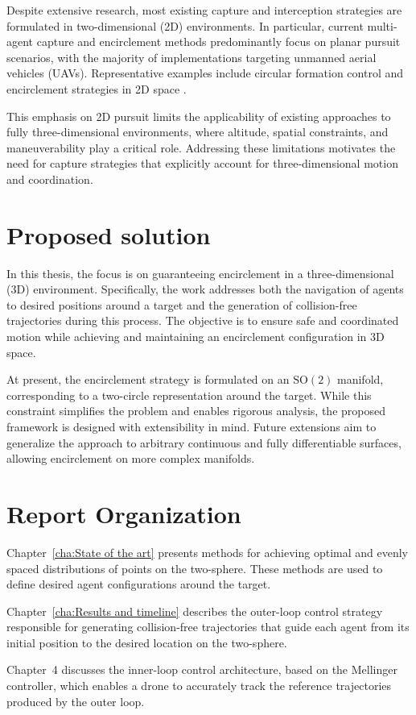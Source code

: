 Despite extensive research, most existing capture and interception strategies are formulated in two-dimensional (2D) environments. In particular, current multi-agent capture and encirclement methods predominantly focus on planar pursuit scenarios, with the majority of implementations targeting unmanned aerial vehicles (UAVs). Representative examples include circular formation control and encirclement strategies in 2D space \cite{2D_circle_formation_survey, 2D_circle_formation_survey_phase_spliting, 2D_circle_formation_phase_spliting, 2D_encirclement_guaranteed_sectors, 2D_circle_formation_phase_spliting_3_and_other_methods}. 

This emphasis on 2D pursuit limits the applicability of existing approaches to fully three-dimensional environments, where altitude, spatial constraints, and maneuverability play a critical role. Addressing these limitations motivates the need for capture strategies that explicitly account for three-dimensional motion and coordination.

\section{Proposed solution} \label{sec.1:Proposed solution}

In this thesis, the focus is on guaranteeing encirclement in a three-dimensional (3D) environment. Specifically, the work addresses both the navigation of agents to desired positions around a target and the generation of collision-free trajectories during this process. The objective is to ensure safe and coordinated motion while achieving and maintaining an encirclement configuration in 3D space.

At present, the encirclement strategy is formulated on an $\mathrm{SO}(2)$ manifold, corresponding to a two-circle representation around the target. While this constraint simplifies the problem and enables rigorous analysis, the proposed framework is designed with extensibility in mind. Future extensions aim to generalize the approach to arbitrary continuous and fully differentiable surfaces, allowing encirclement on more complex manifolds.

\section{Report Organization} \label{sec.1:Report organization}

Chapter~\ref{cha:State of the art} presents methods for achieving optimal and evenly spaced distributions of points on the two-sphere. These methods are used to define desired agent configurations around the target.

Chapter~\ref{cha:Results and timeline} describes the outer-loop control strategy responsible for generating collision-free trajectories that guide each agent from its initial position to the desired location on the two-sphere.

Chapter~4 discusses the inner-loop control architecture, based on the Mellinger controller, which enables a drone to accurately track the reference trajectories produced by the outer loop.
